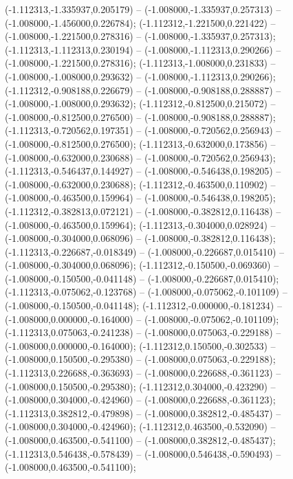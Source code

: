  (-1.112313,-1.335937,0.205179) -- (-1.008000,-1.335937,0.257313) -- (-1.008000,-1.456000,0.226784);
 (-1.112312,-1.221500,0.221422) -- (-1.008000,-1.221500,0.278316) -- (-1.008000,-1.335937,0.257313);
 (-1.112313,-1.112313,0.230194) -- (-1.008000,-1.112313,0.290266) -- (-1.008000,-1.221500,0.278316);
 (-1.112313,-1.008000,0.231833) -- (-1.008000,-1.008000,0.293632) -- (-1.008000,-1.112313,0.290266);
 (-1.112312,-0.908188,0.226679) -- (-1.008000,-0.908188,0.288887) -- (-1.008000,-1.008000,0.293632);
 (-1.112312,-0.812500,0.215072) -- (-1.008000,-0.812500,0.276500) -- (-1.008000,-0.908188,0.288887);
 (-1.112313,-0.720562,0.197351) -- (-1.008000,-0.720562,0.256943) -- (-1.008000,-0.812500,0.276500);
 (-1.112313,-0.632000,0.173856) -- (-1.008000,-0.632000,0.230688) -- (-1.008000,-0.720562,0.256943);
 (-1.112313,-0.546437,0.144927) -- (-1.008000,-0.546438,0.198205) -- (-1.008000,-0.632000,0.230688);
 (-1.112312,-0.463500,0.110902) -- (-1.008000,-0.463500,0.159964) -- (-1.008000,-0.546438,0.198205);
 (-1.112312,-0.382813,0.072121) -- (-1.008000,-0.382812,0.116438) -- (-1.008000,-0.463500,0.159964);
 (-1.112313,-0.304000,0.028924) -- (-1.008000,-0.304000,0.068096) -- (-1.008000,-0.382812,0.116438);
 (-1.112313,-0.226687,-0.018349) -- (-1.008000,-0.226687,0.015410) -- (-1.008000,-0.304000,0.068096);
 (-1.112312,-0.150500,-0.069360) -- (-1.008000,-0.150500,-0.041148) -- (-1.008000,-0.226687,0.015410);
 (-1.112313,-0.075062,-0.123768) -- (-1.008000,-0.075062,-0.101109) -- (-1.008000,-0.150500,-0.041148);
 (-1.112312,-0.000000,-0.181234) -- (-1.008000,0.000000,-0.164000) -- (-1.008000,-0.075062,-0.101109);
 (-1.112313,0.075063,-0.241238) -- (-1.008000,0.075063,-0.229188) -- (-1.008000,0.000000,-0.164000);
 (-1.112312,0.150500,-0.302533) -- (-1.008000,0.150500,-0.295380) -- (-1.008000,0.075063,-0.229188);
 (-1.112313,0.226688,-0.363693) -- (-1.008000,0.226688,-0.361123) -- (-1.008000,0.150500,-0.295380);
 (-1.112312,0.304000,-0.423290) -- (-1.008000,0.304000,-0.424960) -- (-1.008000,0.226688,-0.361123);
 (-1.112313,0.382812,-0.479898) -- (-1.008000,0.382812,-0.485437) -- (-1.008000,0.304000,-0.424960);
 (-1.112312,0.463500,-0.532090) -- (-1.008000,0.463500,-0.541100) -- (-1.008000,0.382812,-0.485437);
 (-1.112313,0.546438,-0.578439) -- (-1.008000,0.546438,-0.590493) -- (-1.008000,0.463500,-0.541100);
